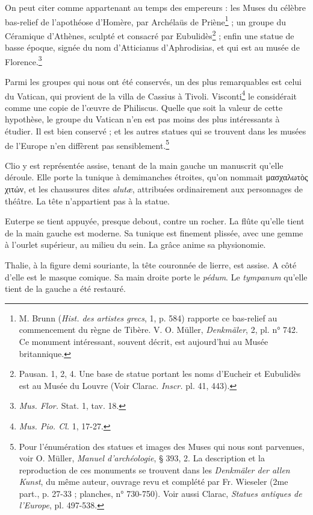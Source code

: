 \documentclass[a4paper, 11pt, oneside, polutonikogreek, french]{article}
\begin{document}
On peut citer comme appartenant au temps des empereurs : les Muses du célèbre bas-relief de l'apothéose d'Homère, par Archélaüs de Priène\footnote{M. Brunn (\emph{Hist. des artistes grecs}, 1, p. 584) rapporte ce bas-relief au commencement du règne de Tibère. V. O. Müller, \emph{Denkmäler}, 2, pl. n° 742. Ce monument intéressant, souvent décrit, est aujourd'hui au Musée britannique.} ; un groupe du Céramique d'Athènes, sculpté et consacré par Eubulidès\footnote{Pausan. 1, 2, 4. Une base de statue portant les noms d'Eucheir et Eubulidès est au Musée du Louvre (Voir Clarac. \emph{Inscr.} pl. 41, 443).} ; enfin une statue de basse époque, signée du nom d'Atticianus d'Aphrodisias, et qui est au musée de Florence.\footnote{\emph{Mus. Flor.} Stat. 1, tav. 18.}

Parmi les groupes qui nous ont été conservés, un des plus remarquables est celui du Vatican, qui provient de la villa de Cassius à Tivoli. Visconti\footnote{\emph{Mus. Pio. Cl.} 1, 17-27.} le considérait comme une copie de l'œuvre de Philiscus. Quelle que soit la valeur de cette hypothèse, le groupe du Vatican n'en est pas moins des plus intéressants à étudier. Il est bien conservé ; et les autres statues qui se trouvent dans les musées de l'Europe n'en diffèrent pas sensiblement.\footnote{Pour l'énumération des statues et images des Muses qui nous sont parvenues, voir O. Müller, \emph{Manuel d'archéologie}, § 393, 2. La description et la reproduction de ces monuments se trouvent dans les \emph{Denkmäler der allen Kunst}, du même auteur, ouvrage revu et complété par Fr. Wieseler (2me part., p. 27-33 ; planches, n° 730-750). Voir aussi Clarac, \emph{Statues antiques de l'Europe}, pl. 497-538.}

Clio y est représentée assise, tenant de la main gauche un manuscrit qu'elle déroule. Elle porte la tunique à demimanches étroites, qu'on nommait μασχαλωτὸς χιτών, et les chaussures dites \emph{alutæ}, attribuées ordinairement aux personnages de théâtre. La tête n'appartient pas à la statue.

Euterpe se tient appuyée, presque debout, contre un rocher. La flûte qu'elle tient de la main gauche est moderne. Sa tunique est finement plissée, avec une gemme à l'ourlet supérieur, au milieu du sein. La grâce anime sa physionomie.

Thalie, à la figure demi souriante, la tête couronnée de lierre, est assise. A côté d'elle est le masque comique. Sa main droite porte le \emph{pédum}. Le \emph{tympanum} qu'elle tient de la gauche a été restauré.
\end{document}
